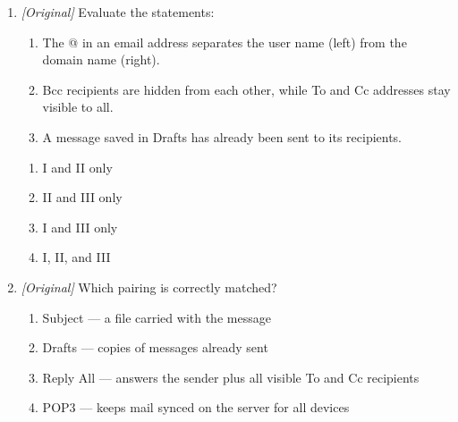 \documentclass[11pt]{article}
\begin{document}
\begin{enumerate}[label=\textbf{Q\arabic*.}, leftmargin=*]
\begin{enumerate}[label=\Alph*.]
    \item Integrated Message Alert Protocol
  \end{enumerate}
\item \textit{[Original]} Evaluate the statements:
  \begin{enumerate}[label=\Roman*.]
    \item The @ in an email address separates the user name (left) from the domain name (right).
    \item Bcc recipients are hidden from each other, while To and Cc addresses stay visible to all.
    \item A message saved in Drafts has already been sent to its recipients.
  \end{enumerate}
  \begin{enumerate}[label=\Alph*.]
    \item I and II only
    \item II and III only
    \item I and III only
    \item I, II, and III
  \end{enumerate}
\item \textit{[Original]} Which pairing is correctly matched?
  \begin{enumerate}[label=\Alph*.]
    \item Subject --- a file carried with the message
    \item Drafts --- copies of messages already sent
    \item Reply All --- answers the sender plus all visible To and Cc recipients
    \item POP3 --- keeps mail synced on the server for all devices
  \end{enumerate}


\end{enumerate}
\end{document}
